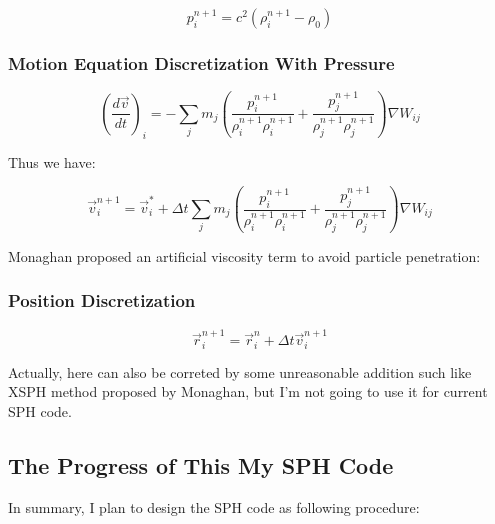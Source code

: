 \documentclass[10pt, oneside]{article}
\begin{document}
\begin{equation}
    p_i^{n+1} = c^2 \left(
        \rho_i^{n+1} - \rho_0
    \right)
\end{equation}

\subsubsection{Motion Equation Discretization With Pressure}

\begin{equation}
    \left(\frac{d\vec{v}}{dt}\right)_i = -
    \sum_j m_j \left(
        \frac{p_i^{n+1}}{\rho_i^{n+1}\rho_i^{n+1}}+\frac{p_j^{n+1}}{\rho_j^{n+1}\rho_j^{n+1}}
    \right) \nabla W_{ij}
\end{equation}

Thus we have:

\begin{equation}
    \vec{v}_i^{n+1} = \vec{v}_i^* + \Delta t 
        \sum_j m_j \left(
        \frac{p_i^{n+1}}{\rho_i^{n+1}\rho_i^{n+1}}+\frac{p_j^{n+1}}{\rho_j^{n+1}\rho_j^{n+1}}
    \right) \nabla W_{ij}
\end{equation}

Monaghan proposed an artificial viscosity term to avoid particle penetration:

\subsubsection{Position Discretization}

\begin{equation}
    \vec{r}_i^{n+1} = \vec{r}_i^n + \Delta t \vec{v}_i^{n+1}
\end{equation}

Actually, here can also be correted by some unreasonable addition such like XSPH method 
proposed by Monaghan, 
but I'm not going to use it for current SPH code.

\subsection{The Progress of This My SPH Code}

In summary, 
I plan to design the SPH code as following procedure:
\end{document}
